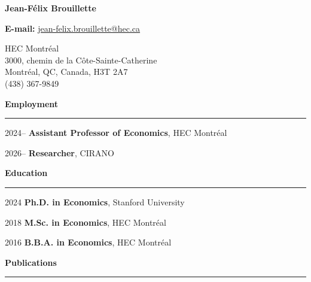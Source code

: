 \documentclass[12pt]{article}
\begin{document}
\begin{center}
{\huge \textbf{Jean-F\'elix Brouillette}} \\

\vspace{0.5cm}

\textbf{E-mail:} \href{mailto:jean-felix.brouillette@hec.ca}{jean-felix.brouillette@hec.ca} \\

\vspace{0.5cm}

\begin{small}
HEC Montr\'eal \\
3000, chemin de la C\^ote-Sainte-Catherine \\
Montr\'eal, QC, Canada, H3T 2A7 \\
(438) 367-9849
\end{small}
\end{center}

{\large \textbf{Employment}} \\
\noindent\rule[0.5\baselineskip]{\textwidth}{1pt}

\begin{small}
2024-- \tabto{1.5cm} \textbf{Assistant Professor of Economics}, HEC Montr\'eal

2026-- \tabto{1.5cm} \textbf{Researcher}, CIRANO
\end{small}

\vspace{0.5cm}

{\large \textbf{Education}} \\
\noindent\rule[0.5\baselineskip]{\textwidth}{1pt}

\begin{small}
2024 \tabto{1.5cm} \textbf{Ph.D. in Economics}, Stanford University

2018 \tabto{1.5cm} \textbf{M.Sc. in Economics}, HEC Montr\'eal

2016 \tabto{1.5cm} \textbf{B.B.A. in Economics}, HEC Montr\'eal
\end{small}

\vspace{0.5cm}

{\large \textbf{Publications}} \\
\noindent\rule[0.5\baselineskip]{\textwidth}{1pt}
\end{document}
